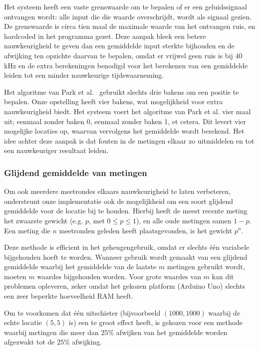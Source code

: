 \documentclass[a4paper,10pt]{article}
\begin{document}
Het systeem heeft een vaste grenswaarde om te bepalen of er een geluidssignaal ontvangen wordt: alle input die die waarde overschrijdt, wordt als signaal gezien. De grenswaarde is circa tien maal de maximale waarde van het ontvangen ruis, en hardcoded in het programma gezet. Deze aanpak bleek een betere nauwkeurigheid te geven dan een gemiddelde input sterkte bijhouden en de afwijking ten opzichte daarvan te bepalen, omdat er vrijwel geen ruis is bij 40 kHz en de extra berekeningen benodigd voor het berekenen van een gemiddelde leiden tot een minder nauwkeurige tijdswaarneming.

Het algoritme van Park et al.~\cite{park2011beacon} gebruikt slechts drie bakens om een positie te bepalen. Onze opstelling heeft vier bakens, wat mogelijkheid voor extra nauwkeurigheid biedt. Het systeem voert het algoritme van Park et al. vier maal uit; eenmaal zonder baken 0, eenmaal zonder baken 1, et cetera. Dit levert vier mogelijke locaties op, waarvan vervolgens het gemiddelde wordt berekend. Het idee achter deze aanpak is dat fouten in de metingen elkaar zo uitmiddelen en tot een nauwkeuriger resultaat leiden.

\subsubsection{Glijdend gemiddelde van metingen}
Om ook meerdere meetrondes elkaars nauwkeurigheid te laten verbeteren, ondersteunt onze implementatie ook de mogelijkheid om een soort glijdend gemiddelde voor de locatie bij te houden. Hierbij heeft de meest recente meting het zwaarste gewicht (e.g. $p$, met $0 \leq p \leq 1$), en alle oude metingen samen $1-p$. Een meting die $n$ meetronden geleden heeft plaatsgevonden, is het gewicht $p^{n}$.

Deze methode is efficient in het geheugengebruik, omdat er slechts \'e\'en variabele bijgehouden hoeft te worden. Wanneer gebruik wordt gemaakt van een glijdend gemiddelde waarbij het gemiddelde van de laatste $m$ metingen gebruikt wordt, moeten $m$ waardes bijgehouden worden. Voor grote waardes van $m$ kan dit problemen opleveren, zeker omdat het gekozen platform (Arduino Uno) slechts een zeer beperkte hoeveelheid RAM heeft.

Om te voorkomen dat \'e\'en uitschieter (bijvoorbeeld $(1000,1000)$ waarbij de echte locatie $(5,5)$ is) een te groot effect heeft, is gekozen voor een methode waarbij metingen die meer dan $25\%$ afwijken van het gemiddelde worden afgezwakt tot de $25\%$ afwijking.
\end{document}
